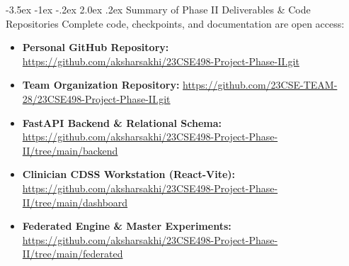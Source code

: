 \documentclass[11pt, a4paper]{article}
\makeatletter
\renewcommand\section{\@startsection {section}{1}{\z@}%
                                   {-3.5ex \@plus -1ex \@minus -.2ex}%
                                   {2.0ex \@plus.2ex}%
                                   {\normalfont\large\bfseries\color{amritaMaroon}}}
\makeatother
\begin{document}
\section{Summary of Phase II Deliverables \& Code Repositories}
Complete code, checkpoints, and documentation are open access:
\begin{itemize}
    \scriptsize
    \item \textbf{Personal GitHub Repository:} \url{https://github.com/aksharsakhi/23CSE498-Project-Phase-II.git}
    \item \textbf{Team Organization Repository:} \url{https://github.com/23CSE-TEAM-28/23CSE498-Project-Phase-II.git}
    \item \textbf{FastAPI Backend \& Relational Schema:} \url{https://github.com/aksharsakhi/23CSE498-Project-Phase-II/tree/main/backend}
    \item \textbf{Clinician CDSS Workstation (React-Vite):} \url{https://github.com/aksharsakhi/23CSE498-Project-Phase-II/tree/main/dashboard}
    \item \textbf{Federated Engine \& Master Experiments:} \url{https://github.com/aksharsakhi/23CSE498-Project-Phase-II/tree/main/federated}
\end{itemize}

\vspace{0.2cm}
\nocite{churaev2023,jothimurugesan2022,arivazhagan2020,mcmahan2017,liu2022}
\nocite{yang2025mvfl,kalakoti2025fedxai,noseda2025financial,karamanlioglu2025clinical,wang2025personalized}
\nocite{abdelsater2024llama,maher2025automl,gupta2025privacy,yuan2024trend,tang2025horizon}
\nocite{zhang2022multitask,larocca2021attention,amato2023clustering,larocca2022shap,bernardi2023adaptive}
\nocite{dusing2025sepsis,qayyum2023fedsepsis,lei2025supervised,pan2025multiprog,maurya2025secure}



\end{document}
